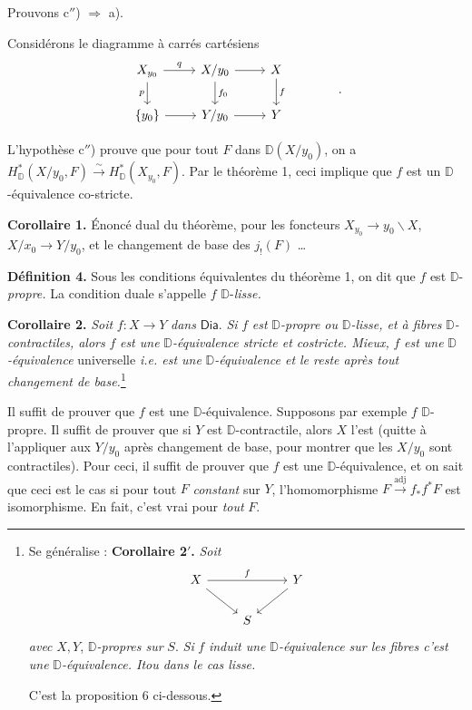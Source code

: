 \documentclass[11pt,leqno]{article}
\newcommand{\printedpage}[1]{\marginpar{\footnotesize p.~#1}}
\newcommand{\msp}[1]{\marginpar{\footnotesize [#1]}}
\newcommand{\Dia}{\mathsf{Dia}}
\newcommand{\D}{\mathbb{D}}
\begin{document}
Prouvons c$''$) $\Rightarrow$ a).

\msp{page 70}

\noindent Considérons le diagramme à carrés cartésiens
\[
\begin{tikzcd}
X_{y_0} \arrow[r, "q"] \arrow[d, "p"{swap}] & X/y_0 \arrow[r] \arrow[d, "f_0"] & X \arrow[d, "f"] \\
\{y_0\} \arrow[r] & Y/y_0 \arrow[r] & Y
\end{tikzcd}
\qquad\qquad .
\]

\noindent L'hypothèse c$''$) prouve que pour tout $F$ dans $\D(X/y_0)$, on a $H^*_{\D}(X/y_0, F) \overset{\sim}{\to} H^*_{\D}(X_{y_0}, F)$. Par le théorème 1, ceci implique que $f$ est un $\D$-équivalence co-stricte. %

\noindent\textbf{Corollaire 1.} Énoncé dual du théorème, pour les foncteurs $X_{y_0} \to y_0\backslash X$, $X/x_0 \to Y/y_0$, et le changement de base des $j_!(F)$ \ldots

\noindent\textbf{Définition 4.} Sous les conditions équivalentes du théorème 1, on dit que $f$ est $\D$-\textit{propre.} La condition duale s'appelle $f$ $\D$-\textit{lisse.}

\noindent\textbf{Corollaire 2.} \textit{Soit} $f : X \to Y$ \textit{dans} $\Dia$. \textit{Si} $f$ \textit{est} $\D$\textit{-propre ou} $\D$\textit{-lisse, et à fibres} $\D$\textit{-contractiles, alors} $f$ \textit{est une} $\D$\textit{-équivalence stricte et costricte. Mieux,} $f$ \textit{est une} $\D$\textit{-équivalence} universelle \textit{i.e. est une} $\D$\textit{-équivalence et le reste après tout changement de base.}\footnote[31]{Se généralise : \textbf{Corollaire 2$'$.} \textit{Soit}
\[
\begin{tikzcd}[ampersand replacement=\&]
X \arrow[rr, "f"] \arrow[dr] \& \& Y \arrow[dl] \\
\& S \&
\end{tikzcd}
\]
\textit{avec} $X, Y$, $\D$\textit{-propres sur} $S$. \textit{Si} $f$ \textit{induit une} $\D$\textit{-équivalence sur les fibres c'est une} $\D$\textit{-équivalence. Itou dans le cas lisse.}\par
C'est la proposition 6 ci-dessous.}

\printedpage{42}
\msp{page 71}

\noindent Il suffit de prouver que $f$ est une $\D$-équivalence. Supposons par exemple $f$ $\D$-propre. Il suffit de prouver que si $Y$ est $\D$-contractile, alors $X$ l'est (quitte à l'appliquer aux $Y/y_0$ après changement de base, pour montrer que les $X/y_0$ sont contractiles). Pour ceci, il suffit de prouver que $f$ est une $\D$-équivalence, et on sait que ceci est le cas si pour tout $F$ \textit{constant} sur $Y$, l'homomorphisme $F \overset{\text{adj}}{\longrightarrow} f_*f^*F$ est isomorphisme. En fait, c'est vrai pour \textit{tout} $F$.
\end{document}
